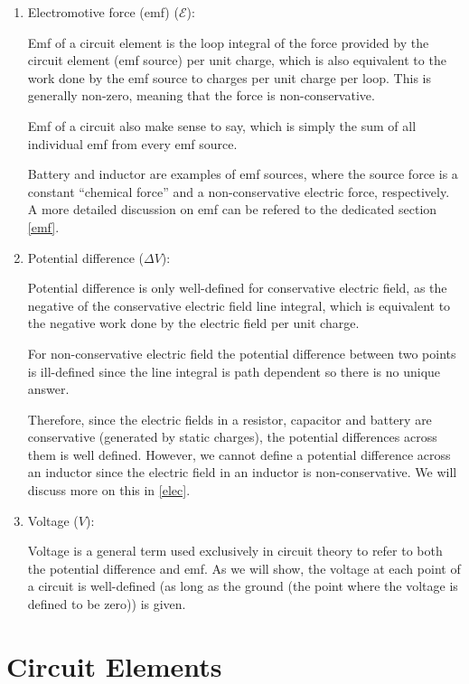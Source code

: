 \documentclass[english,a4paper,12pt]{report}
\begin{document}
\begin{enumerate}
    \item Electromotive force (emf) (\(\mathcal{E}\)): 

    Emf of a circuit element is the loop integral of the force provided by the circuit element (emf source) per unit charge, which is also equivalent to the work done by the emf source to charges per unit charge per loop. This is generally non-zero, meaning that the force is non-conservative.
    
    Emf of a circuit also make sense to say, which is simply the sum of all individual emf from every emf source.

    Battery and inductor are examples of emf sources, where the source force is a constant ``chemical force'' and a non-conservative electric force, respectively. A more detailed discussion on emf can be refered to the dedicated section \cref{emf}. 

    \item Potential difference (\(\Delta V\)): 
    
    Potential difference is only well-defined for conservative electric field, as the negative of the conservative electric field line integral, which is equivalent to the negative work done by the electric field per unit charge.
    
    For non-conservative electric field the potential difference between two points is ill-defined since the line integral is path dependent so there is no unique answer. 

    Therefore, since the electric fields in a resistor, capacitor and battery are conservative (generated by static charges), the potential differences across them is well defined. However, we cannot define a potential difference across an inductor since the electric field in an inductor is non-conservative. We will discuss more on this in \cref{elec}. 

    \item Voltage (\(V\)): 
    
    Voltage is a general term used exclusively in circuit theory to refer to both the potential difference and emf. As we will show, the voltage at each point of a circuit is well-defined (as long as the ground (the point where the voltage is defined to be zero)) is given.
\end{enumerate}

\section{Circuit Elements}
\end{document}
